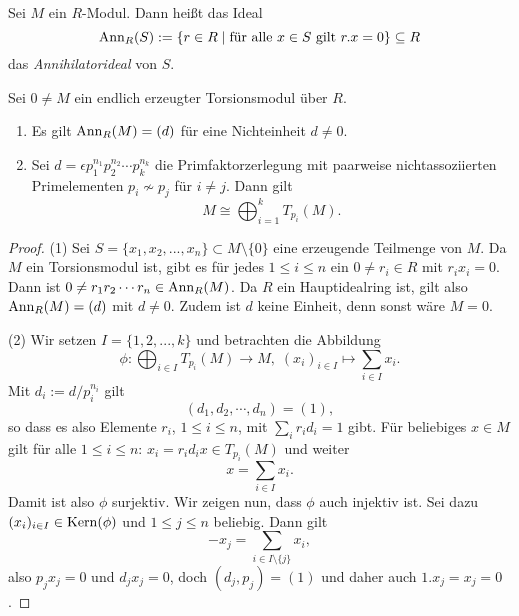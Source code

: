\documentclass{book}
\begin{document}
\begin{defi}
    \label{defi:ann} Sei $M$ ein $R$-Modul. 
            Dann heißt das Ideal
            \[
                \operatorname{Ann}_R(S) := \{ r \in R\;|\; \text{für alle $x \in S$ gilt $r.x = 0$}\} \subseteq R
            \]
            das \emph{Annihilatorideal} von $S$.
\end{defi}

\begin{prop}
    \label{prop:torfin}
    Sei $0 \ne M$ ein endlich erzeugter Torsionsmodul über $R$. 
    \begin{enumerate}
        \item Es gilt $\operatorname{Ann}_R(M) = (d)$ für eine Nichteinheit $d \ne 0$. 
        \item Sei $d = \epsilon p_1^{n_1} p_2^{n_2} \cdots p_k^{n_k}$ die
            Primfaktorzerlegung mit paarweise nichtassoziierten Primelementen
            $p_i \not \sim p_j$ für $i \ne j$. Dann gilt
            \[
                M \cong \bigoplus_{i = 1}^k T_{p_i}(M).
            \]
    \end{enumerate}
\end{prop}
\begin{proof}
    (1) Sei $S= \{x_1, x_2, ..., x_n\} \subset M \setminus \{0\}$ eine
    erzeugende Teilmenge von $M$. Da $M$ ein Torsionsmodul ist, gibt es für
    jedes $1 \le i \le n$ ein $0 \ne r_i \in R$ mit $r_i x_i = 0$. Dann ist $0 \ne r_1 r_2 \cdots r_n \in
    \operatorname{Ann}_R(M)$. Da $R$ ein Hauptidealring ist, gilt also $\operatorname{Ann}_R(M) = (d)$ mit
    $d \ne 0$. Zudem ist $d$ keine Einheit, denn sonst wäre $M = 0$. 

    (2) Wir setzen $I = \{1,2,...,k\}$ und betrachten die Abbildung
    \[
        \phi: \bigoplus_{i \in I} T_{p_i}(M) \to M, \; (x_i)_{i \in I} \mapsto \sum_{i \in I} x_i.
    \]
    Mit $d_i := d/p_i^{n_i}$ gilt
    \[
        (d_1, d_2, \cdots, d_n) = (1),
    \]
    so dass es also Elemente $r_i$, $1 \le i \le n$, mit $\sum_i r_i d_i = 1$ gibt. Für
    beliebiges $x \in M$ gilt für alle $1 \le i \le n$: $x_i = r_i d_i x \in T_{p_i}(M)$ und weiter
    \[
        x = \sum_{i \in I} x_i.
    \]
    Damit ist also $\phi$ surjektiv. Wir zeigen nun, dass $\phi$ auch injektiv
    ist. Sei dazu $(x_i)_{i \in I} \in \Kern(\phi)$ und $1 \le j \le n$ beliebig. Dann gilt
    \[
        -x_j = \sum_{i \in I \setminus \{j\} } x_i,
    \]
    also $p_j x_j = 0$ und $d_j x_j = 0$, doch $(d_j,p_j) = (1)$ und daher
    auch $1.x_j = x_j = 0$. 
\end{proof}
\end{document}
